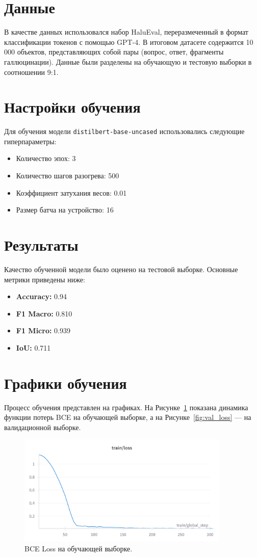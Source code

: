 \documentclass[12pt]{article}
\begin{document}
\section*{Данные}
В качестве данных использовался набор HaluEval, переразмеченный в формат классификации токенов с помощью GPT-4. В итоговом датасете содержится 10 000 объектов, представляющих собой пары (вопрос, ответ, фрагменты галлюцинации). Данные были разделены на обучающую и тестовую выборки в соотношении 9:1.

\section*{Настройки обучения}
Для обучения модели \texttt{distilbert-base-uncased} использовались следующие гиперпараметры:
\begin{itemize}
\item Количество эпох: 3
\item Количество шагов разогрева: 500
\item Коэффициент затухания весов: 0.01
\item Размер батча на устройство: 16
\end{itemize}

\section*{Результаты}
Качество обученной модели было оценено на тестовой выборке. Основные метрики приведены ниже:
\begin{itemize}
\item \textbf{Accuracy:} 0.94
\item \textbf{F1 Macro:} 0.810
\item \textbf{F1 Micro:} 0.939
\item \textbf{IoU:} 0.711
\end{itemize}

\section*{Графики обучения}
Процесс обучения представлен на графиках. На Рисунке~\ref{fig:loss_train} показана динамика функции потерь BCE на обучающей выборке, а на Рисунке~\ref{fig:val_loss} --- на валидационной выборке.
\begin{figure}[h]
\centering
\includegraphics[width=0.9\textwidth]{W&B Chart 22.11.2024, 17_47_03.png}
\caption{BCE Loss на обучающей выборке.}
\label{fig:loss_train}
\end{figure}
\end{document}
